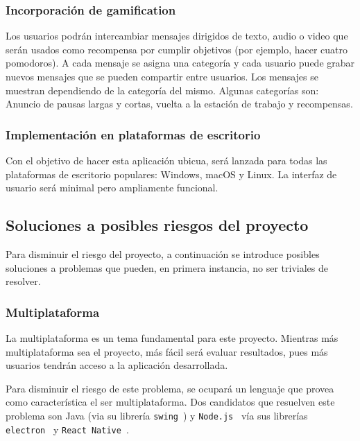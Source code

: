 \documentclass[12pt,letterpaper]{report}
\begin{document}
\subsubsection{Incorporación de gamification}

Los usuarios podrán intercambiar mensajes dirigidos de texto, audio o video que serán usados como recompensa por cumplir
objetivos (por ejemplo, hacer cuatro pomodoros). A cada mensaje se asigna una categoría y cada usuario puede grabar
nuevos mensajes que se pueden compartir entre usuarios. Los mensajes se muestran dependiendo de la categoría del mismo.
Algunas categorías son: Anuncio de pausas largas y cortas, vuelta a la estación de trabajo y recompensas. 

\subsubsection{Implementación en plataformas de escritorio}

Con el objetivo de hacer esta aplicación ubicua, será lanzada para todas las plataformas de escritorio populares:
Windows, macOS y Linux. La interfaz de usuario será minimal pero ampliamente funcional.


\subsection{Soluciones a posibles riesgos del proyecto}

Para disminuir el riesgo del proyecto, a continuación se introduce posibles soluciones a problemas que pueden, en
primera instancia, no ser triviales de resolver.


\subsubsection{Multiplataforma}\label{multiplataforma}

La multiplataforma es un tema fundamental para este proyecto. Mientras
más multiplataforma sea el proyecto, más fácil será evaluar resultados,
pues más usuarios tendrán acceso a la aplicación desarrollada.

Para disminuir el riesgo de este problema, se ocupará un lenguaje que provea como característica el ser multiplataforma.
Dos candidatos que resuelven este problema son Java (via su librería \texttt{swing}~\cite{javaswing}) y
\texttt{Node.js}~\cite{nodejs} vía sus librerías \texttt{electron}~\cite{electron} y \texttt{React\
Native}~\cite{react-native}.
\end{document}
